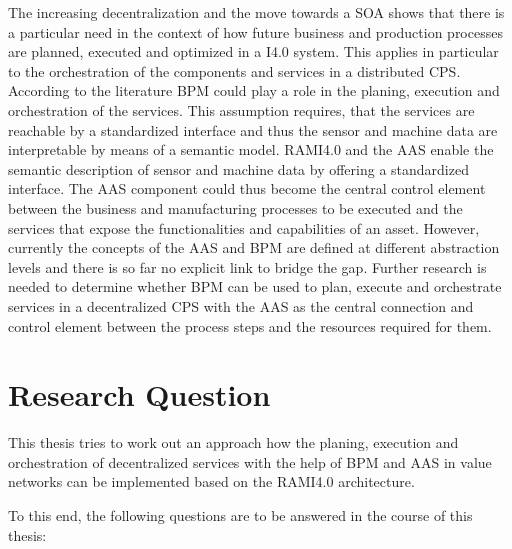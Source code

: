The increasing decentralization and the move towards a \ac{SOA} shows that there is a particular need in the context of how future business and production processes are planned, executed and optimized in a \ac{I4.0} system. This applies in particular to the orchestration of the components and services in a distributed \ac{CPS}. According to the literature \ac{BPM} could play a role in the planing, execution and orchestration of the services. This assumption requires, that the services are reachable by a standardized interface and thus the sensor and machine data are interpretable by means of a semantic model. \ac{RAMI4.0} and the \ac{AAS} enable the semantic description of sensor and machine data by offering a standardized interface. The \ac{AAS} component could thus become the central control element between the business and manufacturing processes to be executed and the services that expose the functionalities and capabilities of an asset. However, currently the concepts of the \ac{AAS} and \ac{BPM} are defined at different abstraction levels and there is so far no explicit link to bridge the gap. Further research is needed to determine whether BPM can be used to plan, execute and orchestrate services in a decentralized \ac{CPS} with the \ac{AAS} as the central connection and control element between the process steps and the resources required for them. 

\section{Research Question}
This thesis tries to work out an approach how the planing, execution and orchestration of decentralized services with the help of \ac{BPM} and \ac{AAS} in value networks can be implemented based on the \ac{RAMI4.0} architecture.

To this end, the following questions are to be answered in the course of this thesis:

